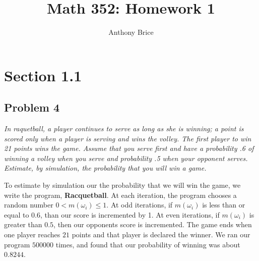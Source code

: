 \documentclass{tufte-handout}
\title{Math 352: Homework 1}
\author{Anthony Brice}
\begin{document}
\maketitle
\section{Section 1.1}
\subsection{Problem 4}
\begin{description}
\item \textit{In raquetball, a player continues to serve as long as
    she is winning; a point is scored only when a player is serving
    and wins the volley. The first player to win 21 points wins the
    game. Assume that you serve first and have a probability .6 of
    winning a volley when you serve and probability .5 when your
    opponent serves. Estimate, by simulation, the probability that you
    will win a game.}
\end{description}  

To estimate by simulation our the probability that we will win the
game, we write the program, \textbf{Racquetball}\footnotemark. At each
iteration, the program chooses a random number $0 < m(\omega_i) \leq
1$. At odd iterations, if $m(\omega_i)$ is less than or equal to
$0.6$, than our score is incremented by 1. At even iterations, if
$m(\omega_i)$ is greater than $0.5$, then our opponents score is
incremented. The game ends when one player reaches $21$ points and
that player is declared the winner. We ran our program $500000$ times,
and found that our probability of winning was about $0.8244$.

\end{document}
